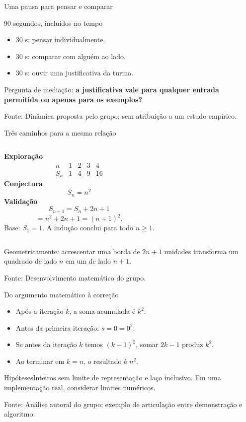\documentclass[aspectratio=169,11pt]{beamer}
\newcommand{\fonte}[1]{\par\vfill{\tiny\color{gray}Fonte: #1}}
\begin{document}
\begin{frame}{Uma pausa para pensar e comparar}
\begin{block}{90 segundos, incluídos no tempo}\begin{itemize}\item 30 s: pensar individualmente.\item 30 s: comparar com alguém ao lado.\item 30 s: ouvir uma justificativa da turma.\end{itemize}\end{block}\medskip Pergunta de mediação: \textbf{a justificativa vale para qualquer entrada permitida ou apenas para os exemplos?}
\fonte{Dinâmica proposta pelo grupo; sem atribuição a um estudo empírico.}
\end{frame}
\begin{frame}{Três caminhos para a mesma relação}
\begin{columns}[T]\textbf{Exploração}\[\begin{array}{c|rrrr}n&1&2&3&4\\\hline S_n&1&4&9&16\end{array}\]\textbf{Conjectura}\[S_n=n^2\]\textbf{Validação}\[S_{n+1}=S_n+2n+1\]\[=n^2+2n+1=(n+1)^2.\]Base: $S_1=1$. A indução conclui para todo $n\geq1$.\end{columns}\medskip Geometricamente: acrescentar uma borda de $2n+1$ unidades transforma um quadrado de lado $n$ em um de lado $n+1$.
\fonte{Desenvolvimento matemático do grupo.}
\end{frame}
\begin{frame}{Do argumento matemático à correção}
\begin{itemize}\item Após a iteração $k$, a soma acumulada é $k^2$.\item Antes da primeira iteração: $s=0=0^2$.\item Se antes da iteração $k$ temos $(k-1)^2$, somar $2k-1$ produz $k^2$.\item Ao terminar em $k=n$, o resultado é $n^2$.\end{itemize}\begin{alertblock}{Hipóteses}Inteiros sem limite de representação e laço inclusivo. Em uma implementação real, considerar limites numéricos.\end{alertblock}
\fonte{Análise autoral do grupo; exemplo de articulação entre demonstração e algoritmo.}
\end{frame}
\end{document}
